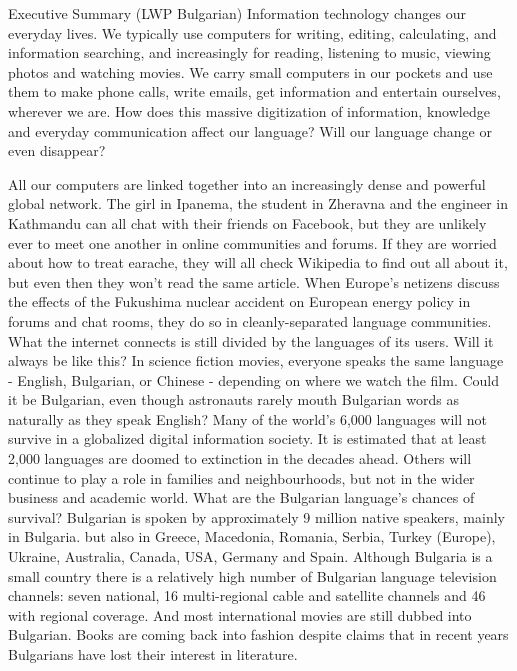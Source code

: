   \begin{multicols}{2}

  Executive Summary (LWP Bulgarian) 
Information technology changes our everyday lives. We typically use computers for writing, editing, calculating, and information searching, and increasingly for reading, listening to music, viewing photos and watching movies. We carry small computers in our pockets and use them to make phone calls, write emails, get information and entertain ourselves, wherever we are. How does this massive digitization of information, knowledge and everyday communication affect our language? Will our language change or even disappear?

All our computers are linked together into an increasingly dense and powerful global network. The girl in Ipanema, the student in Zheravna and the engineer in Kathmandu can all chat with their friends on Facebook, but they are unlikely ever to meet one another in online communities and forums. If they are worried about how to treat earache, they will all check Wikipedia to find out all about it, but even then they won’t read the same article. When Europe's netizens discuss the effects of the Fukushima nuclear accident on European energy policy in forums and chat rooms, they do so in cleanly-separated language communities. What the internet connects is still divided by the languages of its users. Will it always be like this? 
In science fiction movies, everyone speaks the same language - English, Bulgarian, or Chinese - depending on where we watch the film. Could it be Bulgarian, even though astronauts rarely mouth Bulgarian words as naturally as they speak English? Many of the world’s 6,000 languages will not survive in a globalized digital information society. It is estimated that at least 2,000 languages are doomed to extinction in the decades ahead. Others will continue to play a role in families and neighbourhoods, but not in the wider business and academic world. What are the Bulgarian language’s chances of survival? 
Bulgarian is spoken by approximately 9 million native speakers, mainly in Bulgaria. but also in Greece, Macedonia, Romania, Serbia, Turkey (Europe), Ukraine, Australia, Canada, USA, Germany and Spain. Although Bulgaria is a small country there is a relatively high number of Bulgarian language television channels: seven national, 16 multi-regional cable and satellite channels and 46 with regional coverage. And most international movies are still dubbed into Bulgarian. Books are coming back into fashion despite claims that in recent years Bulgarians have lost their interest in literature.

\end{multicols}

